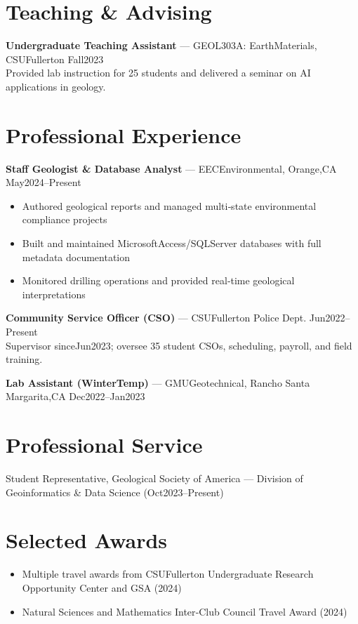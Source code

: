 \documentclass[10pt]{res}
\begin{document}
\section{Teaching \& Advising}
\textbf{Undergraduate Teaching Assistant} — GEOL303A: EarthMaterials, CSUFullerton \hfill Fall2023\\
Provided lab instruction for 25 students and delivered a seminar on AI applications in geology.

\section{Professional Experience}
\textbf{Staff Geologist \& Database Analyst} — EECEnvironmental, Orange,CA \hfill May2024–Present
\begin{itemize}[leftmargin=*, noitemsep]
  \item Authored geological reports and managed multi‑state environmental compliance projects
  \item Built and maintained MicrosoftAccess/SQLServer databases with full metadata documentation
  \item Monitored drilling operations and provided real‑time geological interpretations
\end{itemize}

\textbf{Community Service Officer (CSO)} — CSUFullerton Police Dept. \hfill Jun2022–Present\\
Supervisor sinceJun2023; oversee 35 student CSOs, scheduling, payroll, and field training.

\textbf{Lab Assistant (WinterTemp)} — GMUGeotechnical, Rancho Santa Margarita,CA \hfill Dec2022–Jan2023

\section{Professional Service}
Student Representative, Geological Society of America — Division of Geoinformatics \& Data Science (Oct2023–Present)

\section{Selected Awards}
\begin{itemize}[noitemsep]
  \item Multiple travel awards from CSUFullerton Undergraduate Research Opportunity Center and GSA (2024)
  \item Natural Sciences and Mathematics Inter‑Club Council Travel Award (2024)
\end{itemize}
\end{document}
